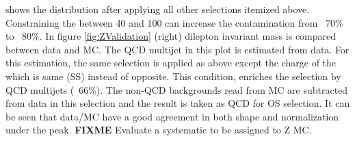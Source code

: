 shows the \tauMT distribution after applying all other selections itemized above. Constraining the \tauMT between 40 and 100 \GeV can increase the \Z contamination from ~70\% to ~80\%. In figure \ref{fig:ZValidation} (right)
dilepton invariant mass is compared between data and MC. The QCD multijet in this plot is estimated from data. For this estimation, the same 
selection is applied as above except the charge of the \muTau which is same (SS) instead of opposite. This condition, enriches the selection 
by QCD multijets (~66\%). The non-QCD backgrounds read from MC are subtracted from data in this selection and the result is 
taken as QCD for OS selection.
It can be seen that data/MC have a good agreement in both shape and normalization under the \Z peak. {\bf FIXME} Evaluate a systematic to be assigned to Z MC.
